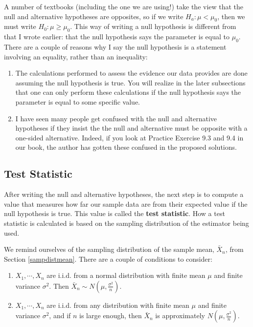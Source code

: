 \documentclass[
]{book}
\begin{document}
A number of textbooks (including the one we are using!) take the view that the null and alternative hypotheses are opposites, so if we write \(H_a: \mu < \mu_0\), then we must write \(H_0: \mu \geq \mu_0\). This way of writing a null hypothesis is different from that I wrote earlier: that the null hypothesis says the parameter is equal to \(\mu_0\). There are a couple of reasons why I say the null hypothesis is a statement involving an equality, rather than an inequality:

\begin{enumerate}
\def\labelenumi{\arabic{enumi}.}
\item
  The calculations performed to assess the evidence our data provides are done assuming the null hypothesis is true. You will realize in the later subsections that one can only perform these calculations if the null hypothesis says the parameter is equal to some specific value.
\item
  I have seen many people get confused with the null and alternative hypotheses if they insist the the null and alternative must be opposite with a one-sided alternative. Indeed, if you look at Practice Exercise 9.3 and 9.4 in our book, the author has gotten these confused in the proposed solutions.
\end{enumerate}

\hypertarget{test-statistic}{%
\subsection{Test Statistic}\label{test-statistic}}

After writing the null and alternative hypotheses, the next step is to compute a value that measures how far our sample data are from their expected value if the null hypothesis is true. This value is called the \textbf{test statistic}. How a test statistic is calculated is based on the sampling distribution of the estimator being used.

We remind ourselves of the sampling distribution of the sample mean, \(\bar{X}_n\), from Section \ref{sampdistmean}. There are a couple of conditions to consider:

\begin{enumerate}
\def\labelenumi{\arabic{enumi}.}
\item
  \(X_1, \cdots, X_n\) are i.i.d. from a normal distribution with finite mean \(\mu\) and finite variance \(\sigma^2\). Then \(\bar{X}_n \sim N(\mu, \frac{\sigma^2}{n})\).
\item
  \(X_1, \cdots, X_n\) are i.i.d. from any distribution with finite mean \(\mu\) and finite variance \(\sigma^2\), and if \(n\) is large enough, then \(\bar{X}_n\) is approximately \(N(\mu, \frac{\sigma^2}{n})\).
\end{enumerate}
\end{document}
